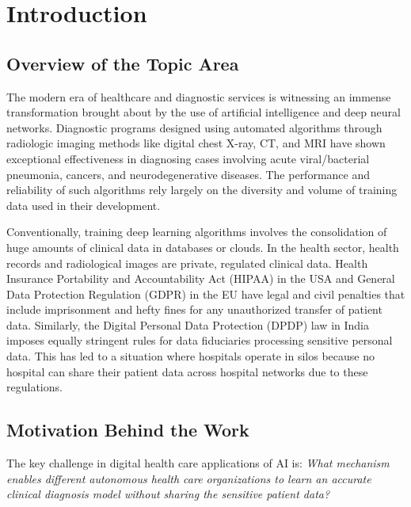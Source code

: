 \documentclass[12pt,a4paper]{report}
\begin{document}
\listoffigures

\newpage
\listoftables

\newpage
{}
\chapter{Introduction}
\label{chap:intro}

\section{Overview of the Topic Area}
The modern era of healthcare and diagnostic services is witnessing an immense transformation brought about by the use of artificial intelligence and deep neural networks. Diagnostic programs designed using automated algorithms through radiologic imaging methods like digital chest X-ray, CT, and MRI have shown exceptional effectiveness in diagnosing cases involving acute viral/bacterial pneumonia, cancers, and neurodegenerative diseases. The performance and reliability of such algorithms rely largely on the diversity and volume of training data used in their development.

Conventionally, training deep learning algorithms involves the consolidation of huge amounts of clinical data in databases or clouds. In the health sector, health records and radiological images are private, regulated clinical data. Health Insurance Portability and Accountability Act (HIPAA) in the USA and General Data Protection Regulation (GDPR) in the EU have legal and civil penalties that include imprisonment and hefty fines for any unauthorized transfer of patient data. Similarly, the Digital Personal Data Protection (DPDP) law in India imposes equally stringent rules for data fiduciaries processing sensitive personal data. This has led to a situation where hospitals operate in silos because no hospital can share their patient data across hospital networks due to these regulations.
\section{Motivation Behind the Work}
The key challenge in digital health care applications of AI is: \emph{What mechanism enables different autonomous health care organizations to learn an accurate clinical diagnosis model without sharing the sensitive patient data?}
\end{document}
